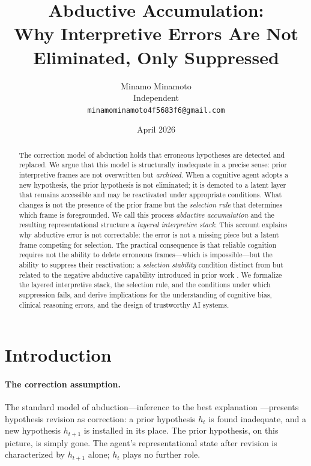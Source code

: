 \documentclass[12pt]{article}
\title{Abductive Accumulation:\\
Why Interpretive Errors Are Not Eliminated, Only Suppressed}
\author{Minamo Minamoto\\
Independent\\
\texttt{minamominamoto4f5683f6@gmail.com}}
\date{April 2026}
\begin{document}
\maketitle

\begin{abstract}
The correction model of abduction holds that erroneous hypotheses
are detected and replaced.
We argue that this model is structurally inadequate in a precise sense:
prior interpretive frames are not overwritten but \emph{archived}.
When a cognitive agent adopts a new hypothesis, the prior hypothesis
is not eliminated; it is demoted to a latent layer that remains
accessible and may be reactivated under appropriate conditions.
What changes is not the presence of the prior frame but the
\emph{selection rule} that determines which frame is foregrounded.
We call this process \emph{abductive accumulation} and the resulting
representational structure a \emph{layered interpretive stack}.
This account explains why abductive error is not correctable:
the error is not a missing piece but a latent frame competing for
selection.
The practical consequence is that reliable cognition requires not
the ability to delete erroneous frames---which is impossible---but
the ability to suppress their reactivation: a \emph{selection
stability} condition distinct from but related to the negative
abductive capability introduced in prior work
\cite{minamoto2026overwrite}.
We formalize the layered interpretive stack, the selection rule,
and the conditions under which suppression fails, and derive
implications for the understanding of cognitive bias, clinical
reasoning errors, and the design of trustworthy AI systems.
\end{abstract}

\tableofcontents

\section{Introduction}

\paragraph{The correction assumption.}
The standard model of abduction---inference to the best explanation
\cite{harman1965}---presents hypothesis revision as correction:
a prior hypothesis $h_t$ is found inadequate, and a new hypothesis
$h_{t+1}$ is installed in its place.
The prior hypothesis, on this picture, is simply gone.
The agent's representational state after revision is characterized
by $h_{t+1}$ alone; $h_t$ plays no further role.
\end{document}
